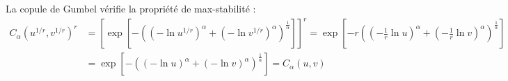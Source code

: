 \documentclass[11pt,a4paper]{article}
\begin{document}
\begin{small}
La copule de Gumbel v\'erifie la propri\'et\'e de max-stabilit\'e :
\begin{align*}
C_\alpha\left(u^{1/r},v^{1/r}\right)^r &= \left[ \exp\left[-\left(\left(-\ln u^{1/r}\right)^\alpha + \left(-\ln v^{1/r}\right)^\alpha\right)^\frac{1}{\alpha}\right] \right]^r 
                                       = \exp\left[ -r\left(\left(-\frac{1}{r}\ln u\right)^\alpha + \left(-\frac{1}{r}\ln v\right)^\alpha\right)^\frac{1}{\alpha} \right] \\
                                      & = \exp\left[ -\left(\left(-\ln u\right)^\alpha + \left(-\ln v\right)^\alpha\right)^\frac{1}{\alpha} \right] = C_\alpha(u,v)
\end{align*}

\end{small}
\end{document}
